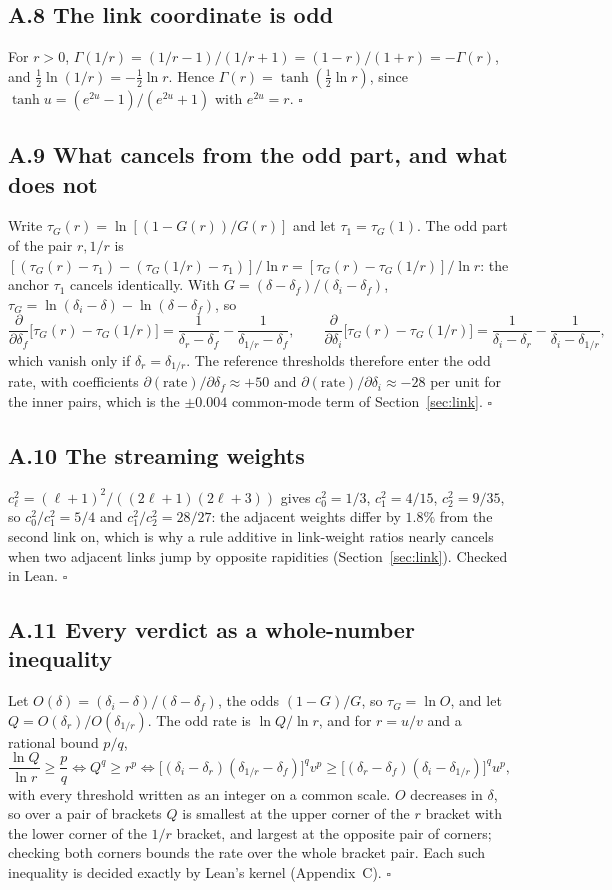 \documentclass[11pt]{article}
\begin{document}
\subsection*{A.8 The link coordinate is odd}
For $r>0$, $\Gamma(1/r)=(1/r-1)/(1/r+1)=(1-r)/(1+r)=-\Gamma(r)$, and $\tfrac12\ln(1/r)=-\tfrac12\ln r$. Hence $\Gamma(r)=\tanh(\tfrac12\ln r)$, since $\tanh u=(e^{2u}-1)/(e^{2u}+1)$ with $e^{2u}=r$. $\square$

\subsection*{A.9 What cancels from the odd part, and what does not}
Write $\tau_G(r)=\ln[(1-G(r))/G(r)]$ and let $\tau_1=\tau_G(1)$. The odd part of the pair $r,1/r$ is $[(\tau_G(r)-\tau_1)-(\tau_G(1/r)-\tau_1)]/\ln r=[\tau_G(r)-\tau_G(1/r)]/\ln r$: the anchor $\tau_1$ cancels identically. With $G=(\delta-\delta_f)/(\delta_i-\delta_f)$, $\tau_G=\ln(\delta_i-\delta)-\ln(\delta-\delta_f)$, so
\[
\frac{\partial}{\partial\delta_f}\big[\tau_G(r)-\tau_G(1/r)\big]=\frac1{\delta_r-\delta_f}-\frac1{\delta_{1/r}-\delta_f},\qquad
\frac{\partial}{\partial\delta_i}\big[\tau_G(r)-\tau_G(1/r)\big]=\frac1{\delta_i-\delta_r}-\frac1{\delta_i-\delta_{1/r}},
\]
which vanish only if $\delta_r=\delta_{1/r}$. The reference thresholds therefore enter the odd rate, with coefficients $\partial(\text{rate})/\partial\delta_f\approx+50$ and $\partial(\text{rate})/\partial\delta_i\approx-28$ per unit for the inner pairs, which is the $\pm0.004$ common-mode term of Section~\ref{sec:link}. $\square$

\subsection*{A.10 The streaming weights}
$c_\ell^2=(\ell+1)^2/((2\ell+1)(2\ell+3))$ gives $c_0^2=1/3$, $c_1^2=4/15$, $c_2^2=9/35$, so $c_0^2/c_1^2=5/4$ and $c_1^2/c_2^2=28/27$: the adjacent weights differ by $1.8\%$ from the second link on, which is why a rule additive in link-weight ratios nearly cancels when two adjacent links jump by opposite rapidities (Section~\ref{sec:link}). Checked in Lean. $\square$

\subsection*{A.11 Every verdict as a whole-number inequality}
Let $O(\delta)=(\delta_i-\delta)/(\delta-\delta_f)$, the odds $(1-G)/G$, so $\tau_G=\ln O$, and let $Q=O(\delta_r)/O(\delta_{1/r})$. The odd rate is $\ln Q/\ln r$, and for $r=u/v$ and a rational bound $p/q$,
\[
\frac{\ln Q}{\ln r}\ge\frac pq\iff Q^q\ge r^p\iff \big[(\delta_i-\delta_r)(\delta_{1/r}-\delta_f)\big]^q v^p\ge\big[(\delta_r-\delta_f)(\delta_i-\delta_{1/r})\big]^q u^p ,
\]
with every threshold written as an integer on a common scale. $O$ decreases in $\delta$, so over a pair of brackets $Q$ is smallest at the upper corner of the $r$ bracket with the lower corner of the $1/r$ bracket, and largest at the opposite pair of corners; checking both corners bounds the rate over the whole bracket pair. Each such inequality is decided exactly by Lean's kernel (Appendix~C). $\square$
\end{document}
